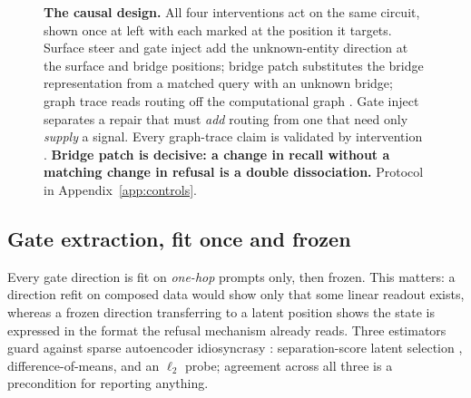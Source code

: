 \documentclass{article}
\begin{document}
\begin{figure}[t]
\vspace{-0.3em}
\caption{\textbf{The causal design.} All four interventions act on the same circuit, shown once at
left with each marked at the position it targets. Surface steer and gate inject add the unknown-entity direction at the
surface and bridge positions; bridge patch substitutes the bridge representation from a matched query with an
unknown bridge; graph trace reads routing off the computational graph
\citep{ameisen2025circuittracing,hanna2025circuittracer}. Gate inject separates a repair that must \emph{add}
routing from one that need only \emph{supply} a signal. Every graph-trace claim is validated by intervention
\citep{lindsey2025biology}. \textbf{Bridge patch is decisive: a change in recall without a matching change in
refusal is a double dissociation.} Protocol in Appendix~\ref{app:controls}.}
\label{fig:causal}
\end{figure}

\subsection{Gate extraction, fit once and frozen}

Every gate direction is fit on \emph{one-hop} prompts only, then frozen. This matters: a direction
refit on composed data would show only that some linear readout exists, whereas a frozen direction
transferring to a latent position shows the state is expressed in the format the refusal mechanism
already reads. Three estimators guard against sparse autoencoder idiosyncrasy
\citep{kissane2024saedataset}: separation-score latent selection
\citep{lieberum2024gemmascope,he2024llamascope}, difference-of-means, and an $\ell_2$ probe;
agreement across all three is a precondition for reporting anything.
\end{document}
